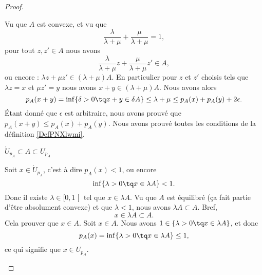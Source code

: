 \begin{proof}
\begin{subproof}
		Vu que \( A\) est convexe, et vu que
		\begin{equation}
			\frac{ \lambda }{\lambda+\mu }+\frac{ \mu }{ \lambda+\mu }=1,
		\end{equation}
		pour tout \( z,z'\in A\) nous avons
		\begin{equation}
			\frac{ \lambda }{ \lambda+\mu }z+\frac{ \mu }{ \lambda+\mu }z'\in A,
		\end{equation}
		ou encore : \( \lambda z+\mu z'\in(\lambda+\mu)A\). En particulier pour \( z\) et \( z'\) choisis tels que \( \lambda z=x\) et \( \mu z'=y\) nous avons \( x+y\in (\lambda+\mu)A\). Nous avons alors
		\begin{equation}
			p_A(x+y)=\inf\{ \delta>0\tq x+y\in \delta A \}\leq \lambda+\mu\leq p_A(x)+p_A(y)+2\epsilon.
		\end{equation}
		Étant donné que \( \epsilon\) est arbitraire, nous avons prouvé que \( p_A(x+y)\leq p_A(x)+p_A(y)\).
		Nous avons prouvé toutes les conditions de la définition \ref{DefPNXlwmi}.
	\end{subproof}
	\begin{proofpart}
		$\mathring{U}_{p_A}\subset A\subset U_{p_A}$
	\end{proofpart}
	\begin{subproof}
		Soit \( x\in \mathring{U}_{p_A}\), c'est à dire \( p_A(x)<1\), ou encore
		\begin{equation}
			\inf\{ \lambda>0\tq x\in \lambda A \}<1.
		\end{equation}
		Donc il existe \( \lambda\in \mathopen[ 0,1\mathclose[\) tel que \( x\in \lambda A\). Vu que \( A\) est équilibré (ça fait partie d'être absolument convexe) et que \( \lambda<1\), nous avons \( \lambda A\subset A\). Bref,
		\begin{equation}
			x\in \lambda A\subset A.
		\end{equation}
		Cela prouver que \( x\in A\).
		Soit \( x\in A\). Nous avons \( 1\in\{ \lambda >0\tq x\in \lambda A \}\), et donc
		\begin{equation}
			p_A(x)=\inf\{ \lambda >0\tq x\in \lambda A \}\leq 1,
		\end{equation}
		ce qui signifie que \( x\in U_{p_A}\).
	\end{subproof}
\end{proof}



